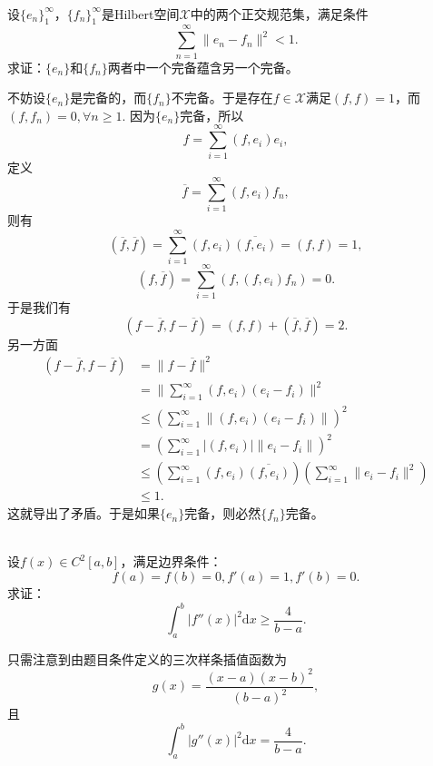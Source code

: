 \begin{exercise}
\hfill\\
设$\{e_n\}_1^{\infty}$，$\{f_n\}_1^{\infty}$是Hilbert空间$\mathscr{X}$中的两个正交规范集，满足条件
\begin{equation}
\sum_{n=1}^{\infty}\|e_n-f_n\|^2<1.
\end{equation}
求证：$\{e_n\}$和$\{f_n\}$两者中一个完备蕴含另一个完备。

不妨设$\{e_n\}$是完备的，而$\{f_n\}$不完备。于是存在$f\in\mathscr{X}$满足$(f,f)=1$，而$(f,f_n)=0,\forall n\geq1.$
因为$\{e_n\}$完备，所以
$$f=\sum_{i=1}^{\infty}(f,e_i)e_i,$$
定义$$\overline{f}=\sum_{i=1}^{\infty}(f,e_i)f_n,$$
则有$$(\overline{f},\overline{f})=\sum_{i=1}^{\infty}(f,e_i)\overline{(f,e_i)}=(f,f)=1,$$
$$(f,\overline{f})=\sum_{i=1}^{\infty}(f,(f,e_i)f_n)=0.$$
于是我们有
$$(f-\overline{f},f-\overline{f})=(f,f)+(\overline{f},\overline{f})=2.$$
另一方面
\begin{align*}
(f-\overline{f},f-\overline{f})&=\|f-\overline{f}\|^2\\
&=\|\sum_{i=1}^{\infty}(f,e_i)(e_i-f_i)\|^2\\
&\leq(\sum_{i=1}^{\infty}\|(f,e_i)(e_i-f_i)\|)^2\\
&=(\sum_{i=1}^{\infty}|(f,e_i)|\|e_i-f_i\|)^2\\
&\leq(\sum_{i=1}^{\infty}(f,e_i)\overline{(f,e_i)})(\sum_{i=1}^{\infty}\|e_i-f_i\|^2)\\
&\leq1.
\end{align*}
这就导出了矛盾。于是如果$\{e_n\}$完备，则必然$\{f_n\}$完备。
\end{exercise}

\begin{exercise}
\hfill\\
设$f(x)\in C^2[a,b]$，满足边界条件：
$$f(a)=f(b)=0,f'(a)=1,f'(b)=0.$$
求证：
$$\int_a^b|f''(x)|^2\mathrm{d}x\geq\frac{4}{b-a}.$$

只需注意到由题目条件定义的三次样条插值函数为
$$g(x)=\frac{(x-a)(x-b)^2}{(b-a)^2},$$
且
$$\int_a^b|g''(x)|^2\mathrm{d}x=\frac{4}{b-a}.$$
\end{exercise}

